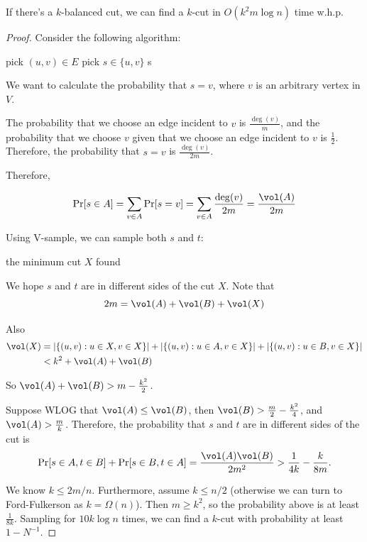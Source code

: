 \begin{lemma}
	If there's a $k$-balanced cut, we can find a $k$-cut in $O(k^2m\log n)$ time w.h.p.
\end{lemma}

\begin{proof}
	Consider the following algorithm:

	\begin{algorithm}[H]
		\caption{V-sample}
		pick $(u,v)\in E$\;
		pick $s\in \{u,v\}$\;
		\Return s\;
	\end{algorithm}

	We want to calculate the probability that $s = v$, where $v$ is an arbitrary vertex in $V$.

	The probability that we choose an edge incident to $v$ is $\frac{\deg(v)}{m}$, and the probability that we choose $v$ given that we choose an edge incident to $v$ is $\frac{1}{2}$. Therefore, the probability that $s = v$ is $\frac{\deg(v)}{2m}$.

	Therefore,

	\[ \Pr[s\in A] = \sum_{v\in A} \Pr[s=v] = \sum_{v\in A} \frac{\deg(v)}{2m} = \frac{\vol(A)}{2m} \]

	Using V-sample, we can sample both $s$ and $t$:

	\begin{algorithm}[H]
		\caption{Balanced Cut}\label{alg:balanced-cut}
		\Return the minimum cut $X$ found\;
	\end{algorithm}

	We hope $s$ and $t$ are in different sides of the cut $X$. Note that
	$$2m = \vol(A) + \vol(B) + \vol(X)$$

	Also
	\begin{align*}
		\vol(X) & = |\{(u,v): u\in X, v\in X\}| + |\{(u,v): u\in A, v\in X\}| + |\{(u,v): u\in B, v\in X\}| \\
		        & < k^2 + \vol(A) + \vol(B)
	\end{align*}

	So $\vol(A) + \vol(B) > m - \frac{k^2}{2}$.

	Suppose WLOG that $\vol(A) \le \vol(B)$, then $\vol(B) > \frac{m}{2} - \frac{k^2}{4}$, and $\vol(A) > \frac{m}{k}$. Therefore, the probability that $s$ and $t$ are in different sides of the cut is
	\[ \Pr[s\in A, t\in B] + \Pr[s\in B, t\in A] = \frac{\vol(A)\vol(B)}{2m^2} > \frac{1}{4k} - \frac{k}{8m}. \]

	We know $k\le 2m/n$. Furthermore, assume $k\le n/2$ (otherwise we can turn to Ford-Fulkerson as $k = \Omega(n)$). Then $m\ge k^2$, so the probability above is at least $\frac{1}{8k}$. Sampling for $10k\log n$ times, we can find a $k$-cut with probability at least $1 - N^{-1}$.
\end{proof}

